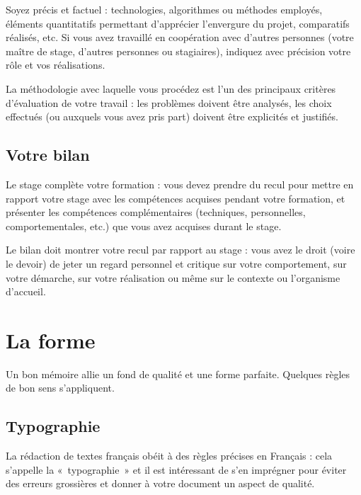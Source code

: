 \documentclass [twoside,openright,a4paper,11pt,french] {report}
\begin{document}
Soyez précis et factuel : technologies, algorithmes ou méthodes
employés, éléments quantitatifs permettant d'apprécier l'envergure
du projet, comparatifs réalisés, etc. Si vous avez travaillé en
coopération avec d'autres personnes (votre maître de stage, d'autres
personnes ou stagiaires), indiquez avec précision votre rôle et vos
réalisations.

La méthodologie avec laquelle vous procédez est l'un des principaux
critères d'évaluation de votre travail : les problèmes doivent
être analysés, les choix effectués (ou auxquels vous avez pris part)
doivent être explicités et justifiés.

\section {Votre bilan}

Le stage complète votre formation : vous devez prendre du recul pour
mettre en rapport votre stage avec les compétences acquises pendant votre
formation, et présenter les compétences complémentaires (techniques,
personnelles, comportementales, etc.) que vous avez acquises durant
le stage.

Le bilan doit montrer votre recul par rapport au stage : vous avez le
droit (voire le devoir) de jeter un regard personnel et critique sur
votre comportement, sur votre démarche, sur votre réalisation ou même
sur le contexte ou l'organisme d'accueil.



\chapter {La forme}
    \label {chap:contexte}

Un bon mémoire allie un fond de qualité et une forme parfaite. Quelques
règles de bon sens s'appliquent.

\section {Typographie}

La rédaction de textes français obéit à des règles précises en
Français : cela s'appelle la «~typographie~» \cite{andre1990} et il
est intéressant de s'en imprégner pour éviter des erreurs grossières
et donner à votre document un aspect de qualité.
\end{document}
